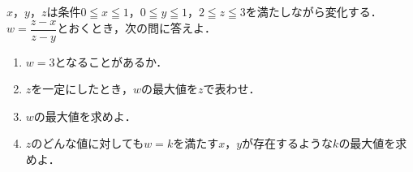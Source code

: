 \documentclass[../../main.tex]{subfiles}
\begin{document}
$x$，$y$，$z$は条件$0 \leqq x \leqq 1$，$0 \leqq y \leqq 1$，$2 \leqq z \leqq 3$を満たしながら変化する．
$\displaystyle w=\dfrac{z-x}{z-y}$とおくとき，次の問に答えよ．
\begin{enumerate}
  \item $w=3$となることがあるか．
  \item $z$を一定にしたとき，$w$の最大値を$z$で表わせ．
  \item $w$の最大値を求めよ．
  \item $z$のどんな値に対しても$w=k$を満たす$x$，$y$が存在するような$k$の最大値を求めよ．
\end{enumerate}
\end{document}
